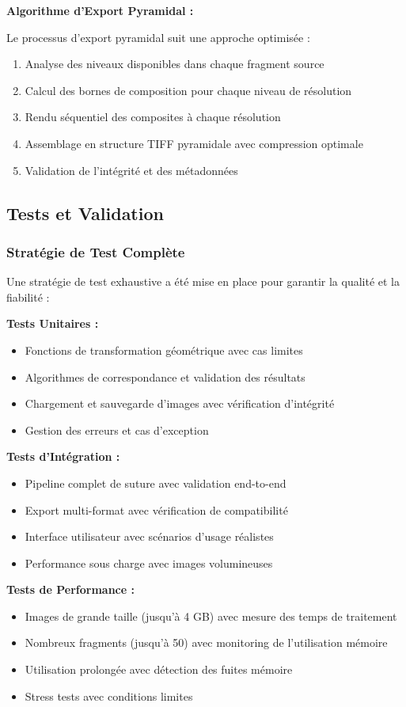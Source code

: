 \documentclass[12pt,a4paper]{article}
\begin{document}
\textbf{Algorithme d'Export Pyramidal :}

Le processus d'export pyramidal suit une approche optimisée :
\begin{enumerate}
\item Analyse des niveaux disponibles dans chaque fragment source
\item Calcul des bornes de composition pour chaque niveau de résolution
\item Rendu séquentiel des composites à chaque résolution
\item Assemblage en structure TIFF pyramidale avec compression optimale
\item Validation de l'intégrité et des métadonnées
\end{enumerate}

\subsection{Tests et Validation}

\subsubsection{Stratégie de Test Complète}

Une stratégie de test exhaustive a été mise en place pour garantir la qualité et la fiabilité :

\textbf{Tests Unitaires :}
\begin{itemize}
\item Fonctions de transformation géométrique avec cas limites
\item Algorithmes de correspondance et validation des résultats
\item Chargement et sauvegarde d'images avec vérification d'intégrité
\item Gestion des erreurs et cas d'exception
\end{itemize}

\textbf{Tests d'Intégration :}
\begin{itemize}
\item Pipeline complet de suture avec validation end-to-end
\item Export multi-format avec vérification de compatibilité
\item Interface utilisateur avec scénarios d'usage réalistes
\item Performance sous charge avec images volumineuses
\end{itemize}

\textbf{Tests de Performance :}
\begin{itemize}
\item Images de grande taille (jusqu'à 4 GB) avec mesure des temps de traitement
\item Nombreux fragments (jusqu'à 50) avec monitoring de l'utilisation mémoire
\item Utilisation prolongée avec détection des fuites mémoire
\item Stress tests avec conditions limites
\end{itemize}
\end{document}
